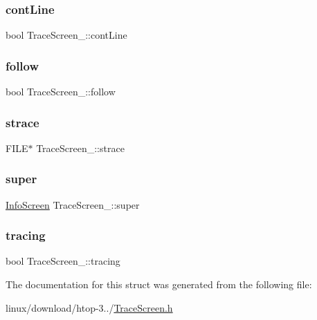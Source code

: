 \subsubsection{\texorpdfstring{cont\+Line}{contLine}}
{\footnotesize\ttfamily bool Trace\+Screen\+\_\+\+::cont\+Line}

\mbox{\label{structTraceScreen___a8782dcafbe90afa1f4e0dbc35ddb0951}} 
\subsubsection{\texorpdfstring{follow}{follow}}
{\footnotesize\ttfamily bool Trace\+Screen\+\_\+\+::follow}

\mbox{\label{structTraceScreen___ab68b0505faf1059d2bcbc054d9f499e3}} 
\subsubsection{\texorpdfstring{strace}{strace}}
{\footnotesize\ttfamily F\+I\+LE$\ast$ Trace\+Screen\+\_\+\+::strace}

\mbox{\label{structTraceScreen___a6804a30542e03a2ef2079a8547350a92}} 
\subsubsection{\texorpdfstring{super}{super}}
{\footnotesize\ttfamily \hyperlink{InfoScreen_8h_a97139d799c65bdbb53b127e2717369c8}{Info\+Screen} Trace\+Screen\+\_\+\+::super}

\mbox{\label{structTraceScreen___abd5d096e7fd68d985255d6604be6e7d9}} 
\subsubsection{\texorpdfstring{tracing}{tracing}}
{\footnotesize\ttfamily bool Trace\+Screen\+\_\+\+::tracing}



The documentation for this struct was generated from the following file\+:\begin{DoxyCompactItemize}
\item 
linux/download/htop-\/3../\hyperlink{TraceScreen_8h}{Trace\+Screen.\+h}\end{DoxyCompactItemize}
